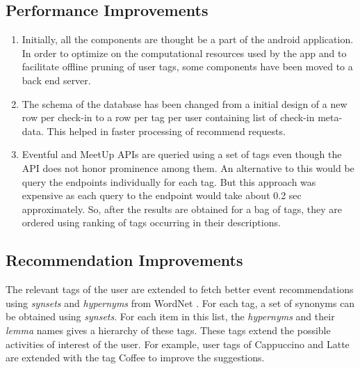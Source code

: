 \documentclass[12pt,letterpaper]{article}
\begin{document}
\subsection{Performance Improvements}
\begin{enumerate}
\item Initially, all the components are thought be a part of the android application. In order to optimize on the computational resources used by the app and to facilitate offline pruning of user tags, some components have been moved to a back end server. 
\item The schema of the database has been changed from a initial design of a new row per check-in to a row per tag per user containing list of check-in meta-data. This helped in faster processing of recommend requests. 
\item Eventful and MeetUp APIs are queried using a set of tags even though the API does not honor prominence among them. An alternative to this would be query the endpoints individually for each tag. But this approach was expensive as each query to the endpoint would take about 0.2 sec approximately. So, after the results are obtained for a bag of tags, they are ordered using ranking of tags occurring in their descriptions.
\end{enumerate}

\subsection{Recommendation Improvements}
The relevant tags of the user are extended to fetch better event recommendations using \emph{synsets} and \emph{hypernyms} from WordNet \cite{wordnet}. For each tag, a set of synonyms can be obtained using \emph{synsets}. For each item in this list, the \emph{hypernyms} and their \emph{lemma} names gives a hierarchy of these tags. These tags extend the possible activities of interest of the user. For example, user tags of Cappuccino and Latte are extended with the tag Coffee to improve the suggestions.
\end{document}
